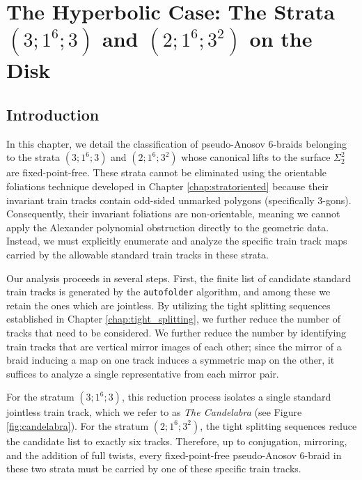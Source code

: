 \chapter{The Hyperbolic Case: The Strata \texorpdfstring{$(3;1^6;3)$}{(3;1\textasciicircum 6;3)} and \texorpdfstring{$(2;1^6;3^2)$}{(2;1\textasciicircum 6;3\textasciicircum 2)} on the Disk}
\label{chap:stratatraintrackanalysis}

\section{Introduction}

In this chapter, we detail the classification of pseudo-Anosov 6-braids belonging to the strata $(3;1^6;3)$ and $(2;1^6;3^2)$ whose canonical lifts to the surface $\Sigma_2^2$ are fixed-point-free. These strata cannot be eliminated using the orientable foliations technique developed in Chapter \ref{chap:stratoriented} because their invariant train tracks contain odd-sided unmarked polygons (specifically 3-gons). Consequently, their invariant foliations are non-orientable, meaning we cannot apply the Alexander polynomial obstruction directly to the geometric data. Instead, we must explicitly enumerate and analyze the specific train track maps carried by the allowable standard train tracks in these strata.

Our analysis proceeds in several steps. First, the finite list of candidate standard train tracks is generated by the \texttt{autofolder} algorithm, and among these we retain the ones which are jointless. By utilizing the tight splitting sequences established in Chapter \ref{chap:tight_splitting}, we further reduce the number of tracks that need to be considered. We further reduce the number by identifying train tracks that are vertical mirror images of each other; since the mirror of a braid inducing a map on one track induces a symmetric map on the other, it suffices to analyze a single representative from each mirror pair.

For the stratum $(3;1^6;3)$, this reduction process isolates a single standard jointless train track, which we refer to as \textit{The Candelabra} (see Figure \ref{fig:candelabra}). For the stratum $(2;1^6;3^2)$, the tight splitting sequences reduce the candidate list to exactly six tracks. Therefore, up to conjugation, mirroring, and the addition of full twists, every fixed-point-free pseudo-Anosov 6-braid in these two strata must be carried by one of these specific train tracks.

